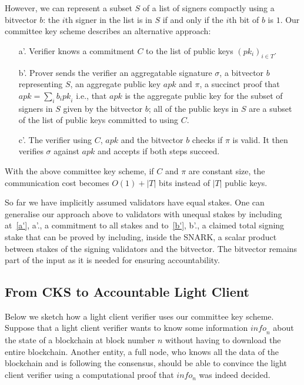 \noindent However, we can represent a subset $S$ of a list of signers compactly using a bitvector $b$:
the $i$th signer in the list is in $S$ if and only if the $i$th bit of $b$ is $1$. Our committee key scheme describes an alternative approach:

\begin{itemize}
\item[a'.]\label{a'} Verifier knows a commitment $C$ to the list of public keys $(pk_i)_{i \in T}$.

\item[b'.]\label{b'} Prover sends the verifier an aggregatable signature $\sigma$, a bitvector $b$ representing $S$, an aggregate public key
$\mathit{apk}$ and $\pi$, a succinct proof that $\mathit{apk}=\sum_i b_i \mathit{pk}_i$ i.e.,
that $\mathit{apk}$ is the aggregate public key for the subset of signers in $S$ given by the bitvector $b$; all of the public keys in $S$ are a subset
of the list of public keys committed to using $C$.

\item[c'.] The verifier using $C$, $\mathit{apk}$ and the bitvector $b$ checks if $\pi$ is valid.
It then verifies $\sigma$ against $\mathit{apk}$ and accepts if both steps succeed.
\end{itemize}

\noindent With the above committee key scheme, if $C$ and $\pi$ are constant size,
the communication cost becomes $O(1)+|T|$ bits instead of $|T|$ public keys.

So far we have implicitly assumed validators have equal stakes.
One can generalise our approach  above to validators with unequal stakes by including at~\ref{a'}, a'.,  a commitment to all stakes
and to~\ref{b'}, b'., a claimed total signing stake that can be proved by including, inside the SNARK, a scalar product between stakes of the signing validators and the bitvector.
The bitvector remains part of the input as it is needed for ensuring accountability.

\subsection{From CKS to Accountable Light Client}
\label{sec_intro_committee}

Below we sketch how a light client verifier uses our committee key scheme. Suppose that a light client verifier wants to know some information $\mathit{info}_n$ about the state of a blockchain at block number $n$ without having to download the entire blockchain. Another entity, a full node, who knows all the data of the blockchain and is following the consensus, should be able to convince the light client verifier using a computational proof that $info_n$ was indeed decided.

